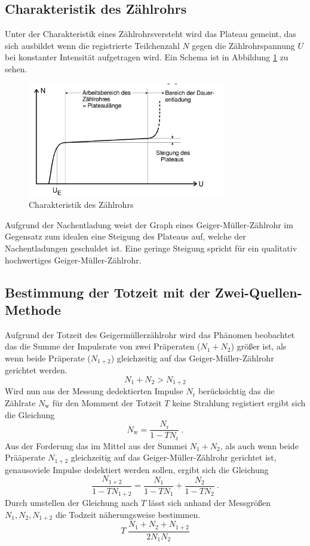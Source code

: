\subsection{Charakteristik des Zählrohrs}
Unter der Charakteristik eines Zählrohrsversteht wird das Plateau gemeint, das sich ausbildet wenn die registrierte Teilchenzahl $N$ gegen die Zählrohrspannung $U$ bei konstanter Intensität aufgetragen wird. Ein Schema ist in Abbildung \ref{fig:Pla} zu sehen.
\begin{figure}
  \centering
  \includegraphics[height=5cm]{picture/Plateau.pdf}
  \caption{Charakteristik des Zählrohrs \cite{sample}}
  \label{fig:Pla}
\end{figure}
Aufgrund der Nachentladung weist der Graph eines Geiger-Müller-Zählrohr im Gegensatz zum idealen eine Steigung des Plateaus auf, welche der Nachentladungen geschuldet ist. Eine geringe Steigung spricht für ein qualitativ hochwertiges Geiger-Müller-Zählrohr.


\subsection{Bestimmung der Totzeit mit der Zwei-Quellen-Methode}
Aufgrund der Totzeit des Geigermüllerzählrohr wird das Phänomen beobachtet das die Summe der Impulsrate von zwei Präperaten ($N_1 + N_2$) größer ist, als wenn beide Präperate ($N_{1+2}$) gleichzeitig auf das Geiger-Müller-Zählrohr gerichtet werden.
\begin{equation}
  	N_1 + N_2 > N_{1+2}
  \label{eqn:ungl}
\end{equation}
Wird nun aus der Messung dedektierten Impulse $N_\text{r}$ berücksichtig das die Zählrate $N_\text{w}$ für den Momment der Totzeit $T$ keine Strahlung registiert ergibt sich die Gleichung
\begin{equation}
  N_\text{w} = \frac{N_\text{r}}{1 - T N_\text{r} } \ .
  \label{eqn:zaelr}
\end{equation}
Aus der Forderung das im Mittel aus der Summei $N_1 + N_2$, als auch wenn beide Prääperate $N_{1+2}$ gleichzeitig auf das Geiger-Müller-Zählrohr gerichtet ist, genausoviele Impulse dedektiert werden sollen, ergibt sich die Gleichung
\begin{equation}
  \frac{N_{1+2}}{1-TN_{1+2}} = \frac{N_{1}}{1-TN_{1}} + \frac{N_{2}}{1-TN_{2}} \ .
\end{equation}
Durch umstellen der Gleichung nach $T$ lässt sich anhand der Messgrößen $N_1, N_2, N_{1+2}$  die Todzeit näherungsweise bestimmen.
\begin{equation}
  T ~ \frac{N_1 + N_2 + N_{1+2}}{2 N_1 N_2}
  \label{eqn:T}
\end{equation}


